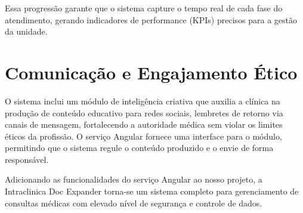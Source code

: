 Essa progressão garante que o sistema capture o tempo real de cada fase do atendimento, gerando indicadores de performance (KPIs) precisos para a gestão da unidade.

\section{Comunicação e Engajamento Ético}

O sistema inclui um módulo de inteligência criativa que auxilia a clínica na produção de conteúdo educativo para redes sociais, lembretes de retorno via canais de mensagem, fortalecendo a autoridade médica sem violar os limites éticos da profissão. O serviço Angular fornece uma interface para o módulo, permitindo que o sistema regule o conteúdo produzido e o envie de forma responsável.

Adicionando as funcionalidades do serviço Angular ao nosso projeto, a Intraclinica Doc Expander torna-se um sistema completo para gerenciamento de consultas médicas com elevado nível de segurança e controle de dados.